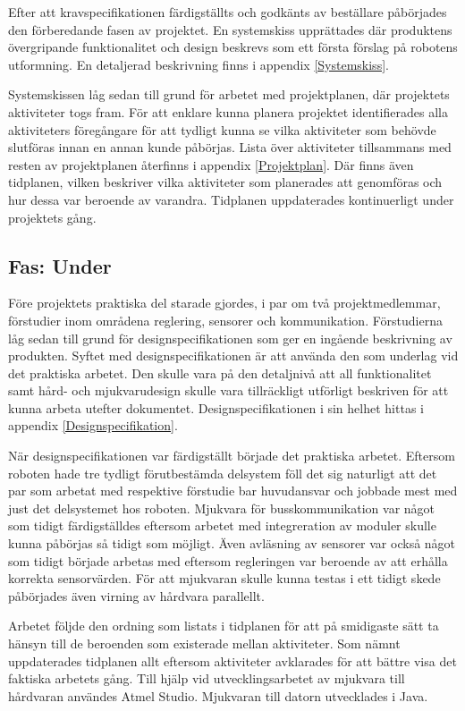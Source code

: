 \documentclass[11pt]{article}
\begin{document}
\begin{flushleft}
Efter att kravspecifikationen färdigställts och godkänts av beställare påbörjades den förberedande fasen av projektet. En systemskiss upprättades där produktens övergripande funktionalitet och design beskrevs som ett första förslag på robotens utformning. En detaljerad beskrivning finns i appendix \ref{Systemskiss}. 

Systemskissen låg sedan till grund för arbetet med projektplanen, där projektets aktiviteter togs fram. För att enklare kunna planera projektet identifierades alla aktiviteters föregångare för att tydligt kunna se vilka aktiviteter som behövde slutföras innan en annan kunde påbörjas. Lista över aktiviteter tillsammans med resten av projektplanen återfinns i appendix \ref{Projektplan}. Där finns även tidplanen, vilken beskriver vilka aktiviteter som planerades att genomföras och hur dessa var beroende av varandra. Tidplanen uppdaterades kontinuerligt under projektets gång.

\subsection{Fas: Under}
Före projektets praktiska del starade gjordes, i par om två projektmedlemmar, förstudier inom områdena reglering, sensorer och kommunikation. Förstudierna låg sedan till grund för designspecifikationen som ger en ingående beskrivning av produkten. Syftet med designspecifikationen är att använda den som underlag vid det praktiska arbetet. Den skulle vara på den detaljnivå att all funktionalitet samt hård- och mjukvarudesign skulle vara tillräckligt utförligt beskriven för att kunna arbeta utefter dokumentet. Designspecifikationen i sin helhet hittas i appendix \ref{Designspecifikation}. 

När designspecifikationen var färdigställt började det praktiska arbetet. Eftersom roboten hade tre tydligt förutbestämda delsystem föll det sig naturligt att det par som arbetat med respektive förstudie bar huvudansvar och jobbade mest med just det delsystemet hos roboten. Mjukvara för busskommunikation var något som tidigt färdigställdes eftersom arbetet med integreration av moduler skulle kunna påbörjas så tidigt som möjligt. Även avläsning av sensorer var också något som tidigt började arbetas med eftersom regleringen var beroende av att erhålla korrekta sensorvärden. För att mjukvaran skulle kunna testas i ett tidigt skede påbörjades även virning av hårdvara parallellt. 

Arbetet följde den ordning som listats i tidplanen för att på smidigaste sätt ta hänsyn till de beroenden som existerade mellan aktiviteter. Som nämnt uppdaterades tidplanen allt eftersom aktiviteter avklarades för att bättre visa det faktiska arbetets gång. Till hjälp vid utvecklingsarbetet av mjukvara till hårdvaran användes Atmel Studio. Mjukvaran till datorn utvecklades i Java. 


\end{flushleft}
\end{document}
